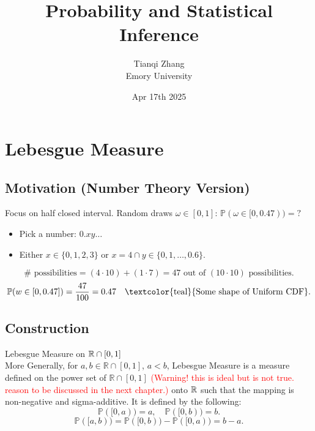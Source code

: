 

\title{\textbf{%
               Probability and Statistical Inference}}
\author{Tianqi Zhang\\
Emory University}
\date{Apr 17th 2025}


\maketitle
\setcounter{tocdepth}{1} %

\setcounter{section}{3}
\section{Lebesgue Measure}
\subsection{Motivation (Number Theory Version)}
Focus on half closed interval. Random draws $\omega \in [0,1]$: $\mathbb{P}(\omega \in [0,0.47)) = ?$
\begin{itemize}
    \item Pick a number: \(0.xy\ldots\)
    \item Either \(x \in \{0,1,2,3\}\) or \(x = 4 \cap y \in \{0, 1, \ldots, 0.6\}\).
\end{itemize}
\[
\#\text{ possibilities} = (4 \cdot 10) + (1 \cdot 7) = 47 \text{ out of } (10 \cdot 10) \text{ possibilities}.
\]
\[
\mathbb{P}(w \in [0,0.47]) = \frac{47}{100} = 0.47 \quad \text{\textcolor{teal}{Some shape of Uniform CDF}}.
\]

\subsection{Construction}
\begin{df}{Lebesgue Measure on ${\mathbb{R}}\cap [0,1]$}\\
More Generally, for \(a, b \in \mathbb{R} \cap [0,1]\), \(a < b\), Lebesgue Measure is a measure defined on the power set of $\mathbb{R} \cap [0,1]$ \textcolor{red}{(Warning! this is ideal but is not true. reason to be discussed in the next chapter.)} onto ${\mathbb{R}}$ such that the mapping is non-negative and sigma-additive. It is defined by the following: 
\[
\mathbb{P}([0,a)) = a, \quad \mathbb{P}([0,b)) = b.
\]
\[
\mathbb{P}([a,b)) = \mathbb{P}([0,b)) - \mathbb{P}([0,a)) = b - a.
\]
\end{df}

